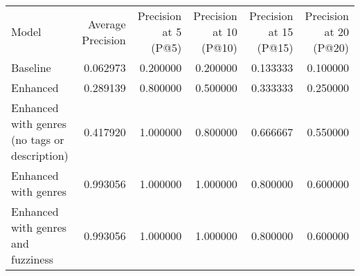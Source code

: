 \begin{tabular}{lrrrrr}
Model & Average Precision & Precision at 5 (P@5) & Precision at 10 (P@10) & Precision at 15 (P@15) & Precision at 20 (P@20) \\
Baseline & 0.062973 & 0.200000 & 0.200000 & 0.133333 & 0.100000 \\
Enhanced & 0.289139 & 0.800000 & 0.500000 & 0.333333 & 0.250000 \\
Enhanced with genres (no tags or description) & 0.417920 & 1.000000 & 0.800000 & 0.666667 & 0.550000 \\
Enhanced with genres & 0.993056 & 1.000000 & 1.000000 & 0.800000 & 0.600000 \\
Enhanced with genres and fuzziness & 0.993056 & 1.000000 & 1.000000 & 0.800000 & 0.600000 \\
\end{tabular}
